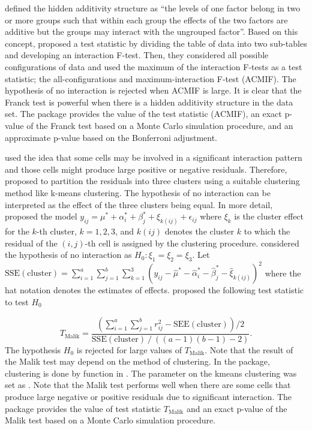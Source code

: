 \noindent {} \citet{Franck:2013} defined the hidden additivity structure as “the levels of one factor belong in two or more groups such that within each group the effects of the two factors are additive but the groups may interact with the ungrouped factor”. Based on this concept, \citet{Franck:2013} proposed a test statistic by dividing the table of data into two sub-tables and developing an interaction F-test. Then, they considered all possible configurations of data and used the maximum of the interaction F-tests as a test statistic; the all-configurations and maximum-interaction F-test (ACMIF). The hypothesis of no interaction is rejected when ACMIF is large. It is clear that the Franck test is powerful when there is a hidden additivity structure in the data set. The package  provides the value of the test statistic (ACMIF), an exact p-value of the Franck test based on a Monte Carlo simulation procedure, and an approximate p-value based on the Bonferroni adjustment.

\noindent {} \citet{Malik:2016} used the idea that some cells may be involved in a significant interaction pattern and those cells might produce large positive or negative residuals. Therefore, \citet{Malik:2016} proposed to partition
 the residuals into three clusters using a suitable clustering method like k-means clustering. The hypothesis of no interaction can be interpreted as the effect of the three clusters being equal. In more detail, \citet{Malik:2016} proposed the model
  $y_{ij}=\mu^{*}+\alpha_i^{*}+\beta_j^{*}+\xi_{k\left(ij\right)}+\epsilon_{ij}$ where $\xi_{k}$ is the cluster effect for the
   $k$-th cluster, $k=1, 2, 3$, and $k\left(ij\right)$ denotes the cluster $k$ to which the residual of the
$\left(i,j\right)$-th cell is assigned by the clustering procedure. \citet{Malik:2016} considered the hypothesis of no
interaction as $H_0: \xi_1=\xi_2=\xi_3$.
 Let $\text{SSE}\left(\text{cluster}\right)=\sum_{i=1}^a\sum_{j=1}^b\sum_{k=1}^3\left(y_{ij}-\hat{\mu}^{*}-\hat{\alpha}_i^{*}-\hat{\beta}_j^{*}-\hat{\xi}_{k\left(ij\right)}\right)^2$ 
 where the hat notation denotes the estimates of effects. \citet{Malik:2016} proposed the following test statistic to test
  $H_0$

\begin{equation*}
	T_{\text{Malik}}=\frac{\left(\sum_{i=1}^a\sum_{j=1}^b
		r_{ij}^2-\text{SEE}\left(\text{cluster}\right)\right)/2}{\text{SSE}\left(\text{cluster}\right)⁄\left(\left(a-1\right)\left(b-1\right)-2\right)}.
\end{equation*}
The hypothesis $H_0$ is rejected for large values of $T_{\text{Malik}}$. Note that the result of the Malik test may depend on the method of clustering. In the  package, clustering is done by  function in . The  parameter on the kmeans clustering was set as . Note that the Malik test performs well when there are some cells that produce large negative or positive residuals due to significant interaction. The package  provides the value of test statistic $T_{\text{Malik}}$ and an exact p-value of the Malik test based on a Monte Carlo simulation procedure.


